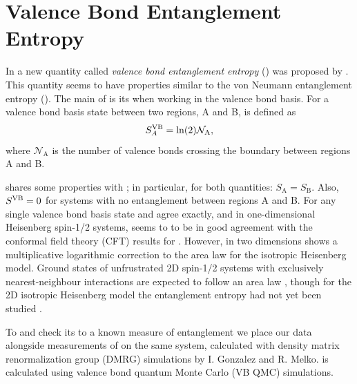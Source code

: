 \chapter{Valence Bond Entanglement Entropy}

In  a new quantity called {\it{valence bond entanglement entropy}} (\vb) was proposed by .  
This quantity seems to have properties similar to the von Neumann entanglement entropy (\vn).
The main  of \vb is its  when working in the valence bond basis.
For a valence bond basis state \vb between two regions, A and B, is defined as 
\begin{equation}
S^{\text{VB}}_A = \ln({2})\mathcal{N}_{\text{A}},
\end{equation} 
where $\mathcal{N}_{\text{A}}$ is the number of valence bonds crossing the boundary between
regions A and B.


\vb shares some properties with \vn; in particular, for both quantities: $S_{\text{A}} = S_{\text{B}}$.
Also, $S^{\text{VB}} = 0$ for systems with no entanglement between regions A and B.
For any single valence bond basis state \vb and \vn agree exactly, and
in one-dimensional Heisenberg spin-1/2 systems, \vb seems to to be in good agreement with
the conformal field theory (CFT) results for \vn.
However, in two dimensions \vb shows a multiplicative logarithmic correction to the area law
for the isotropic Heisenberg model.  
Ground states of unfrustrated 2D spin-1/2 systems with exclusively nearest-neighbour interactions
are expected to follow an area law , though for the 2D isotropic Heisenberg model the entanglement entropy had not yet been studied .


To   and check its  to a known measure of entanglement we place our \vb data alongside measurements of \vn
on the same system, calculated with density matrix renormalization group (DMRG) simulations by I. Gonzalez and R. Melko.
\vb is calculated using valence bond quantum Monte Carlo (VB QMC) simulations.

